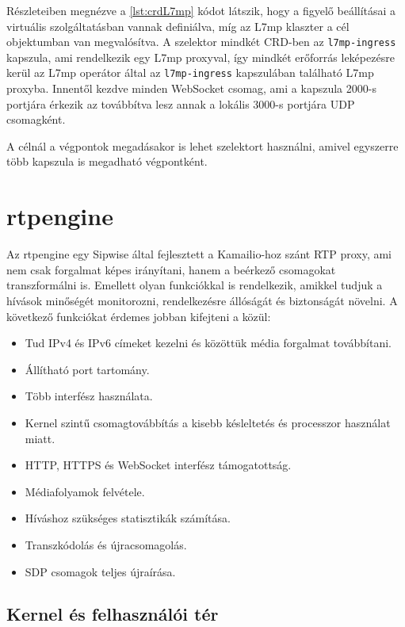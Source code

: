 Részleteiben megnézve a \ref{lst:crdL7mp} kódot látszik, hogy a figyelő beállításai a 
virtuális szolgáltatásban vannak definiálva, míg az L7mp klaszter a cél objektumban van
megvalósítva. A szelektor mindkét CRD-ben az \texttt{l7mp-ingress} kapszula, ami 
rendelkezik egy L7mp proxyval, így mindkét erőforrás leképezésre kerül az L7mp operátor 
által az \texttt{l7mp-ingress} kapszulában található L7mp proxyba. Innentől kezdve minden 
WebSocket csomag, ami a kapszula 2000-s portjára érkezik az továbbítva lesz annak a 
lokális 3000-s portjára UDP csomagként. 

A célnál a végpontok megadásakor is lehet szelektort használni, amivel egyszerre több
kapszula is megadható végpontként. 

\section{rtpengine}

Az rtpengine egy Sipwise  által fejlesztett a Kamailio-hoz szánt RTP proxy, ami nem csak 
forgalmat képes irányítani, hanem a beérkező csomagokat transzformálni is. Emellett olyan 
funkciókkal is rendelkezik, amikkel tudjuk a hívások minőségét monitorozni, rendelkezésre 
állóságát és biztonságát növelni. A következő funkciókat érdemes jobban kifejteni a 
\cite{rtpengine} közül: 

\begin{itemize}
	\item Tud IPv4 és IPv6 címeket kezelni és közöttük média forgalmat továbbítani. 
	\item Állítható port tartomány. 
	\item Több interfész használata. 
	\item Kernel szintű csomagtovábbítás a kisebb késleltetés és processzor használat 
	miatt.
	\item HTTP, HTTPS és WebSocket interfész támogatottság.
	\item Médiafolyamok felvétele. 
	\item Híváshoz szükséges statisztikák számítása.
	\item Transzkódolás és újracsomagolás.
	\item SDP csomagok teljes újraírása. 
\end{itemize}

\subsection{Kernel és felhasználói tér}

